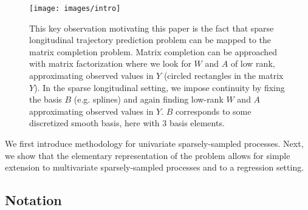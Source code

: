 \documentclass[preprint]{imsart}
\numberwithin{equation}{section}
\theoremstyle{plain}
\begin{document}

\begin{figure}[h]
  \texttt{[image: images/intro]}
  \caption{This key observation motivating this paper is the fact that sparse longitudinal trajectory prediction problem can be mapped to the matrix completion problem. Matrix completion can be approached with matrix factorization where we look for $W$ and $A$ of low rank, approximating observed values in $Y$ (circled rectangles in the matrix $Y$). In the sparse longitudinal setting, we impose continuity by fixing the basis $B$ (e.g. splines) and again finding low-rank $W$ and $A$ approximating observed values in $Y$. $B$ corresponds to some discretized smooth basis, here with $3$ basis elements.}
  \label{fig:idea}
\end{figure}

We first introduce methodology for univariate sparsely-sampled processes. Next, we show that the elementary representation of the problem allows for simple extension to multivariate sparsely-sampled processes and to a regression setting.

\subsection{Notation}
\end{document}
